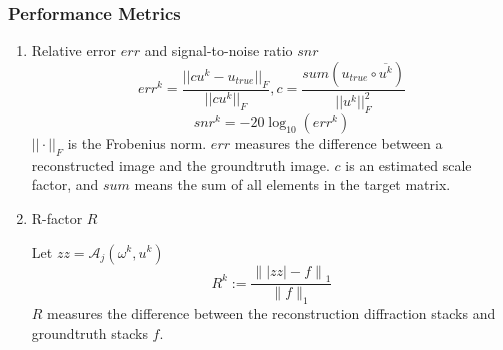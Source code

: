 \documentclass[UTF8]{beamer}
\begin{document}
\begin{frame} \frametitle{Performance Metrics}

\begin{enumerate}
\item Relative error $err$ and signal-to-noise ratio $snr$
$$
err^k = \dfrac{|| c u^k - u_{true} ||_F  }{||c u^k||_F}, c = \frac{sum(u_{true} \circ \overline{u^k}) }{||u^k||_F^2}
$$
$$
snr^k = -20\log_{10}(err^k)
$$
$|| \cdot ||_F$ is the Frobenius norm. $err$ measures the difference between a reconstructed image and the groundtruth image. $c$ is an estimated scale factor, and $sum$ means the sum of all elements in the target matrix. 

\item R-factor $R$

Let $zz = \mathcal{A}_{j}\left(\omega^{k}, u^{k}\right)$
$$
R^{k}:=\frac{\left\| |zz|-f\right\|_{1}}{\|f\|_{1}}
$$
$R$ measures the difference between the reconstruction diffraction stacks and groundtruth stacks $f$. 




\end{enumerate} 


\end{frame}
\end{document}
